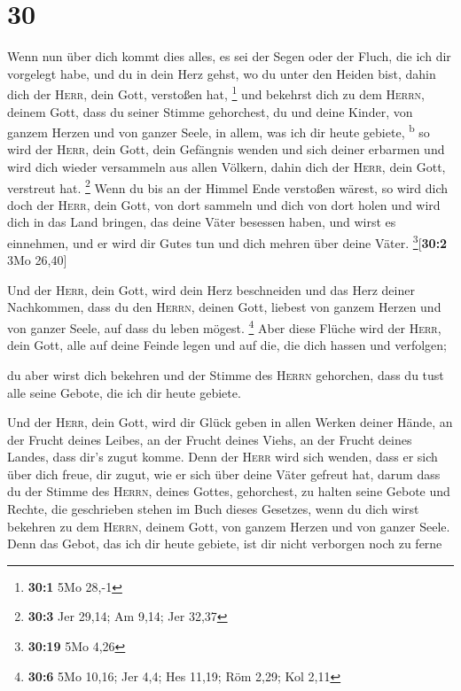 \hypertarget{section-29}{%
\section{30}\label{section-29}}

 Wenn nun über dich kommt dies alles, es sei der Segen
oder der Fluch, die ich dir vorgelegt habe, und du in dein Herz gehst,
wo du unter den Heiden bist, dahin dich der \textsc{Herr}, dein Gott,
verstoßen hat, \footnote{\textbf{30:1} 5Mo 28,-1}  und
bekehrst dich zu dem \textsc{Herrn}, deinem Gott, dass du seiner Stimme
gehorchest, du und deine Kinder, von ganzem Herzen und von ganzer Seele,
in allem, was ich dir heute gebiete, \textsuperscript{b} 
so wird der \textsc{Herr}, dein Gott, dein Gefängnis wenden und sich
deiner erbarmen und wird dich wieder versammeln aus allen Völkern, dahin
dich der \textsc{Herr}, dein Gott, verstreut hat. \footnote{\textbf{30:3}
  Jer 29,14; Am 9,14; Jer 32,37}  Wenn du bis an der
Himmel Ende verstoßen wärest, so wird dich doch der \textsc{Herr}, dein
Gott, von dort sammeln und dich von dort holen  und wird
dich in das Land bringen, das deine Väter besessen haben, und wirst es
einnehmen, und er wird dir Gutes tun und dich mehren über deine Väter.
\footnote{\textbf{30:19} 5Mo 4,26}{[}\textbf{30:2} 3Mo 26,40{]}

 Und der \textsc{Herr}, dein Gott, wird dein Herz
beschneiden und das Herz deiner Nachkommen, dass du den \textsc{Herrn},
deinen Gott, liebest von ganzem Herzen und von ganzer Seele, auf dass du
leben mögest. \footnote{\textbf{30:6} 5Mo 10,16; Jer 4,4; Hes 11,19; Röm
  2,29; Kol 2,11}  Aber diese Flüche wird der
\textsc{Herr}, dein Gott, alle auf deine Feinde legen und auf die, die
dich hassen und verfolgen;

 du aber wirst dich bekehren und der Stimme des
\textsc{Herrn} gehorchen, dass du tust alle seine Gebote, die ich dir
heute gebiete.

 Und der \textsc{Herr}, dein Gott, wird dir Glück geben in
allen Werken deiner Hände, an der Frucht deines Leibes, an der Frucht
deines Viehs, an der Frucht deines Landes, dass dir's zugut komme. Denn
der \textsc{Herr} wird sich wenden, dass er sich über dich freue, dir
zugut, wie er sich über deine Väter gefreut hat,  darum
dass du der Stimme des \textsc{Herrn}, deines Gottes, gehorchest, zu
halten seine Gebote und Rechte, die geschrieben stehen im Buch dieses
Gesetzes, wenn du dich wirst bekehren zu dem \textsc{Herrn}, deinem
Gott, von ganzem Herzen und von ganzer Seele.  Denn das
Gebot, das ich dir heute gebiete, ist dir nicht verborgen noch zu ferne

